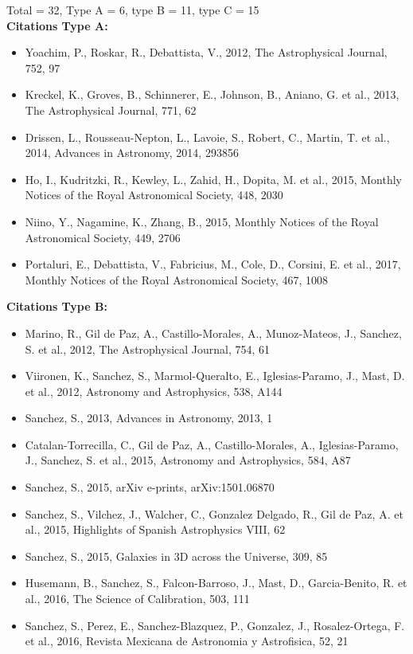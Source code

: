 \documentclass{letter}
\begin{document}
\begin{enumerate}
Total = 32, Type A = 6, type B = 11, type C = 15 \\ 
{\bf Citations Type A:}
\begin{itemize}
\item Yoachim, P., Roskar, R., Debattista, V., 2012, The Astrophysical Journal, 752, 97
\item Kreckel, K., Groves, B., Schinnerer, E., Johnson, B., Aniano, G. et al., 2013, The Astrophysical Journal, 771, 62
\item Drissen, L., Rousseau-Nepton, L., Lavoie, S., Robert, C., Martin, T. et al., 2014, Advances in Astronomy, 2014, 293856
\item Ho, I., Kudritzki, R., Kewley, L., Zahid, H., Dopita, M. et al., 2015, Monthly Notices of the Royal Astronomical Society, 448, 2030
\item Niino, Y., Nagamine, K., Zhang, B., 2015, Monthly Notices of the Royal Astronomical Society, 449, 2706
\item Portaluri, E., Debattista, V., Fabricius, M., Cole, D., Corsini, E. et al., 2017, Monthly Notices of the Royal Astronomical Society, 467, 1008
\end{itemize}
{\bf Citations Type B:}
\begin{itemize}
\item Marino, R., Gil de Paz, A., Castillo-Morales, A., Munoz-Mateos, J., Sanchez, S. et al., 2012, The Astrophysical Journal, 754, 61
\item Viironen, K., Sanchez, S., Marmol-Queralto, E., Iglesias-Paramo, J., Mast, D. et al., 2012, Astronomy and Astrophysics, 538, A144
\item Sanchez, S., 2013, Advances in Astronomy, 2013, 1
\item Catalan-Torrecilla, C., Gil de Paz, A., Castillo-Morales, A., Iglesias-Paramo, J., Sanchez, S. et al., 2015, Astronomy and Astrophysics, 584, A87
\item Sanchez, S., 2015, arXiv e-prints, arXiv:1501.06870
\item Sanchez, S., Vilchez, J., Walcher, C., Gonzalez Delgado, R., Gil de Paz, A. et al., 2015, Highlights of Spanish Astrophysics VIII, 62
\item Sanchez, S., 2015, Galaxies in 3D across the Universe, 309, 85
\item Husemann, B., Sanchez, S., Falcon-Barroso, J., Mast, D., Garcia-Benito, R. et al., 2016, The Science of Calibration, 503, 111
\item Sanchez, S., Perez, E., Sanchez-Blazquez, P., Gonzalez, J., Rosalez-Ortega, F. et al., 2016, Revista Mexicana de Astronomia y Astrofisica, 52, 21

\end{itemize}
\end{enumerate}
\end{document}
